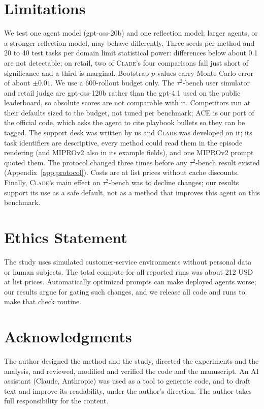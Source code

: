 \documentclass[11pt]{article}
\newcommand{\clade}{\textsc{Clade}\xspace}
\newcommand{\taub}{$\tau^2$-bench\xspace}
\begin{document}
\section*{Limitations}

We test one agent model (gpt-oss-20b) and one reflection model; larger agents, or a stronger reflection model, may
behave differently. Three seeds per method and 20 to 40 test tasks per domain limit statistical power: differences
below about 0.1 are not detectable; on retail, two of \clade's four comparisons fall just short of significance and a third is marginal. Bootstrap
$p$-values carry Monte Carlo error of about $\pm0.01$. We
use a 600-rollout budget only. The \taub user simulator and retail judge are gpt-oss-120b rather than the gpt-4.1 used
on the public leaderboard, so absolute scores are not comparable with it. Competitors run at their defaults sized to
the budget, not tuned per benchmark; ACE is our port of the official code, which asks the agent to cite playbook
bullets so they can be tagged. The support desk was written by us and \clade was developed on it; its task
identifiers are descriptive, every method could read them in the episode rendering (and MIPROv2 also in its example
fields), and one MIPROv2 prompt quoted them. The protocol changed three times before any \taub result existed
(Appendix~\ref{app:protocol}). Costs are at list prices without cache discounts. Finally, \clade's main effect on
\taub was to decline changes; our results support its use as a safe default, not as a method that improves this agent
on this benchmark.

\section*{Ethics Statement}

The study uses simulated customer-service environments without personal data or human subjects. The total compute
for all reported runs was about 212 USD at list prices. Automatically optimized prompts can make deployed agents
worse; our results argue for gating such changes, and we release all code and runs to make that check routine.

\ifdefined\preprintmode
\section*{Acknowledgments}

The author designed the method and the study, directed the experiments and the analysis, and reviewed, modified and
verified the code and the manuscript. An AI assistant (Claude, Anthropic) was used as a tool to generate code, and to draft
text and improve its readability, under the author's direction. The author takes full responsibility for the content.
\fi
\end{document}
